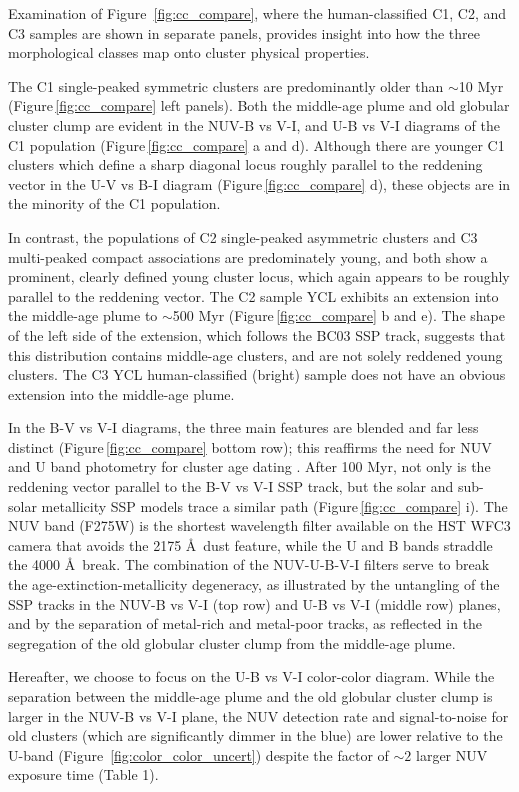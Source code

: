 \documentclass[linenumbers]{aastex63}
\begin{document}
Examination of Figure~\ref{fig:cc_compare}, where the human-classified C1, C2, and C3 samples are shown in separate panels, provides insight into how the three morphological classes map onto cluster physical properties.  

The C1 single-peaked symmetric clusters are predominantly older than $\sim$10 Myr (Figure\,\ref{fig:cc_compare} left panels).  Both the middle-age plume and old globular cluster clump are evident in the NUV-B vs V-I, and U-B vs V-I diagrams of the C1 population (Figure\,\ref{fig:cc_compare} a and d). Although there are younger C1 clusters which define a sharp diagonal locus roughly parallel to the reddening vector in the U-V vs B-I diagram (Figure\,\ref{fig:cc_compare} d), these objects are in the minority of the C1 population.  

In contrast, the populations of C2 single-peaked asymmetric clusters and C3 multi-peaked compact associations are predominately young, and both show a prominent, clearly defined young cluster locus, which again appears to be roughly parallel to the reddening vector.  The C2 sample YCL exhibits an extension into the middle-age plume to $\sim$500 Myr (Figure\,\ref{fig:cc_compare} b and e).  The shape of the left side of the extension, which follows the BC03 SSP track, suggests that this distribution contains middle-age clusters, and are not solely reddened young clusters.  The C3 YCL human-classified (bright) sample does not have an obvious extension into the middle-age plume.

In the B-V vs V-I diagrams, the three main features are blended and far less distinct (Figure\,\ref{fig:cc_compare} bottom row); this {reaffirms} the need for NUV and U band photometry for cluster age dating \citep{smith_young_2007}.  
After 100 Myr, not only is the reddening vector parallel to the B-V vs V-I SSP track, but the solar and sub-solar metallicity SSP models trace a similar path (Figure\,\ref{fig:cc_compare} i).  The NUV band (F275W) is the shortest wavelength filter available on the HST WFC3 camera that avoids the 2175 \AA\ dust feature, while the U and B bands straddle the 4000 \AA\ break.  The combination of the NUV-U-B-V-I filters serve to break the age-extinction-metallicity degeneracy, as illustrated by the untangling of the SSP tracks in the NUV-B vs V-I (top row) and U-B vs V-I (middle row) planes, and by the separation of metal-rich and metal-poor tracks, as reflected in the segregation of the old globular cluster clump from the middle-age plume. 

Hereafter, we choose to focus on the U-B vs V-I color-color diagram.  While the separation between the middle-age plume and the old globular cluster clump is larger in the NUV-B vs V-I plane, the NUV detection rate and signal-to-noise for old clusters (which are significantly dimmer in the blue) are lower relative to the U-band (Figure~\ref{fig:color_color_uncert}) despite the factor of $\sim2$ larger NUV exposure time (Table 1).
\end{document}

